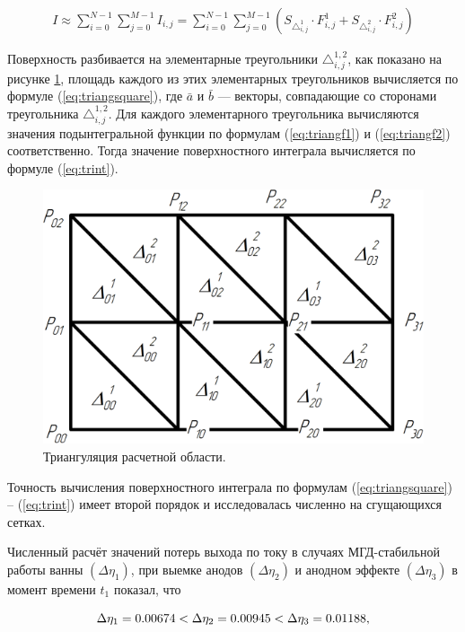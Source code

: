 \documentclass[pdflatex,sn-mathphys-gost]{pmi-jnl}
\begin{document}
\begin{align}\label{eq:trint}
	I \approx \sum_{i=0}^{N-1} \sum_{j=0}^{M-1} I_{i,j} = \sum_{i=0}^{N-1} \sum_{j=0}^{M-1} (S_{\triangle_{i,j}^1} \cdot F_{i,j}^1 + S_{\triangle_{i,j}^2} \cdot F_{i,j}^2)
\end{align}

Поверхность разбивается на элементарные треугольники $\triangle_{i,j}^{1,2}$, как показано на рисунке \ref{fig:triangles}, площадь каждого из этих элементарных треугольников вычисляется по формуле (\ref{eq:triangsquare}), где $\bar{a}$ и $\bar{b}$ — векторы, совпадающие со сторонами треугольника $\triangle_{i,j}^{1,2}$. Для каждого элементарного треугольника вычисляются значения подынтегральной функции по формулам (\ref{eq:triangf1}) и (\ref{eq:triangf2}) соответственно. Тогда значение поверхностного интеграла вычисляется по формуле (\ref{eq:trint}).

\begin{figure}[ht]
    \centering
    \includegraphics[width=150mm]{triangul.png}
    \caption{Триангуляция расчетной области.}
    \label{fig:triangles} 
\end{figure}

Точность вычисления поверхностного интеграла по формулам (\ref{eq:triangsquare}) – (\ref{eq:trint}) имеет второй порядок и исследовалась численно на сгущающихся сетках.

Численный расчёт значений потерь выхода по току в случаях МГД-стабильной работы ванны $(\Delta\eta_1)$, при выемке анодов $(\Delta\eta_2)$ и анодном эффекте $(\Delta\eta_3)$ в момент времени $t_1$ показал, что 

\begin{equation}
	\Delta\eta_1 = 0.00674 < \Delta\eta_2 = 0.00945 < \Delta\eta_3 = 0.01188, \notag
\end{equation}
\end{document}
